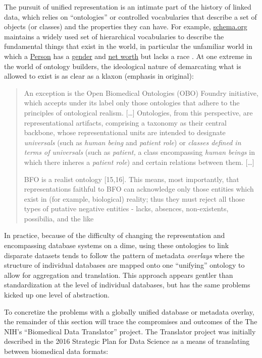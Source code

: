 The pursuit of unified representation is an intimate part of the history
of linked data, which relies on ``ontologies'' or controlled
vocabularies that describe a set of objects (or classes) and the
properties they can have. For example,
\href{https://schema.org}{schema.org} maintains a widely used set of
hierarchical vocabularies to describe the fundamental things that exist
in the world, in particular the unfamiliar world in which a
\href{https://schema.org/Person}{Person} has a
\href{https://schema.org/gender}{gender} and
\href{https://schema.org/netWorth}{net worth} but lacks a race \citep{poirierTurnScruffyEthnographic2017} . At one extreme in the world of
ontology builders, the ideological nature of demarcating what is allowed
to exist is as clear as a klaxon (emphasis in original):

\begin{quote}
An exception is the Open Biomedical Ontologies (OBO) Foundry initiative,
which accepts under its label only those ontologies that adhere to the
principles of ontological realism. {[}\ldots{]} Ontologies, from this
perspective, are representational artifacts, comprising a taxonomy as
their central backbone, whose representational units are intended to
designate \emph{universals} (such as \emph{human being} and
\emph{patient role}) or \emph{classes defined in terms of universals}
(such as \emph{patient,} a class encompassing \emph{human beings} in
which there inheres a \emph{patient role}) and certain relations between
them. {[}\ldots{]}

BFO is a realist ontology {[}15,16{]}. This means, most importantly,
that representations faithful to BFO can acknowledge only those entities
which exist in (for example, biological) reality; thus they must reject
all those types of putative negative entities - lacks, absences,
non-existents, possibilia, and the like \citep{ceustersFoundationsRealistOntology2010} 
\end{quote}

In practice, because of the difficulty of changing the representation
and encompassing database systems on a dime, using these ontologies to
link disparate datasets tends to follow the pattern of metadata
\emph{overlays} where the structure of individual databases are mapped
onto one ``unifying'' ontology to allow for aggregation and translation.
This approach appears gentler than standardization at the level of
individual databases, but has the same problems kicked up one level of
abstraction.

To concretize the problems with a globally unified database or metadata
overlay, the remainder of this section will trace the compromises and
outcomes of the The NIH's ``Biomedical Data Translator'' project. The
Translator project was initially described in the 2016 Strategic Plan
for Data Science as a means of translating between biomedical data
formats:

